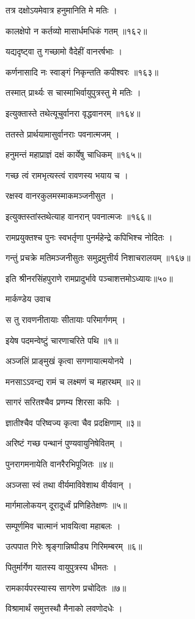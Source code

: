 तत्र दक्षोऽयमेवात्र हनुमानिति मे मतिः ।

कालक्षेपो न कर्तव्यो मासार्धमधिकं गतम् ॥१६२॥

यद्यदृष्ट्वा तु गच्छामो वैदेहीं वानरर्षभाः ।

कर्णनासादि नः स्वाङ्गं निकृन्तति कपीश्वरः ॥१६३॥

तस्मात् प्रार्थ्यः स चास्माभिर्वायुपुत्रस्तु मे मतिः ।

इत्युक्तास्ते तथेत्यूचुर्वानरा वृद्धवानरम् ॥१६४॥

ततस्ते प्रार्थयामासुर्वानराः पवनात्मजम् ।

हनुमन्तं महाप्राज्ञं दक्षं कार्येषु चाधिकम् ॥१६५॥

गच्छ त्वं रामभृत्यस्त्वं रावणस्य भयाय च ।

रक्षस्व वानरकुलमस्माकमञ्जनीसुत ।

इत्युक्तस्तांस्तथेत्याह वानरान् पवनात्मजः ॥१६६॥

रामप्रयुक्तश्च पुनः स्वभर्तृणा पुनर्महेन्द्रे कपिभिश्च नोदितः ।

गन्तुं प्रचक्रे मतिमञ्जनीसुतः समुद्रमुत्तीर्य निशाचरालयम् ॥१६७॥

इति श्रीनरसिंहपुराणे रामप्रादुर्भावे पञ्चाशत्तमोऽध्यायः॥५०॥


मार्कण्डेय उवाच

स तु रावणनीतायाः सीतायाः परिमार्गणम् ।

इयेष पदमन्वेष्टुं चारणाचरिते पथि ॥१॥

अञ्जलिं प्राङ्मुखं कृत्वा सगणायात्मयोनये ।

मनसाऽऽवन्द्य रामं च लक्ष्मणं च महारथम् ॥२॥

सागरं सरितश्चैव प्रणम्य शिरसा कपिः ।

ज्ञातीश्चैव परिष्वज्य कृत्वा चैव प्रदक्षिणाम् ॥३॥

अरिष्टं गच्छ पन्थानं पुण्यवायुनिषेवितम् ।

पुनरागमनायेति वानरैरभिपूजितः ॥४॥

अञ्जसा स्वं तथा वीर्यमाविवेशाथ वीर्यवान् ।

मार्गमालोकयन् दूरादूर्ध्वं प्रणिहितेक्षणः ॥५॥

सम्पूर्णमिव चात्मानं भावयित्वा महाबलः ।

उत्पपात गिरेः श्रृङ्गान्निष्पीड्य गिरिमम्बरम् ॥६॥

पितुर्मार्गेण यातस्य वायुपुत्रस्य धीमतः ।

रामकार्यपरस्यास्य सागरेण प्रचोदितः ॥७॥

विश्रामार्थं समुत्तस्थौ मैनाको लवणोदधेः ।

